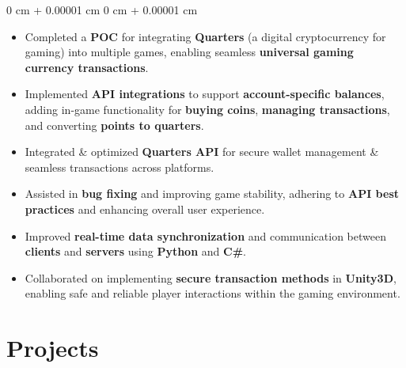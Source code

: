 \documentclass[10pt, letterpaper]{article}
\newenvironment{highlights}{
    \begin{itemize}[
        topsep=0.10 cm,
        parsep=0.10 cm,
        partopsep=0pt,
        itemsep=0pt,
        leftmargin=0 cm + 10pt
    ]
}{
    \end{itemize}
} %
\newenvironment{onecolentry}{
    \begin{adjustwidth}{
        0 cm + 0.00001 cm
    }{
        0 cm + 0.00001 cm
    }
}{
    \end{adjustwidth}
} %
\begin{document}
\begin{onecolentry}
	\begin{highlights}
		\item Completed a \textbf{POC} for integrating \textbf{Quarters} (a digital cryptocurrency for gaming) into multiple games, enabling seamless \textbf{universal gaming currency transactions}.
		\item Implemented \textbf{API integrations} to support \textbf{account-specific balances}, adding in-game functionality for \textbf{buying coins}, \textbf{managing transactions}, and converting \textbf{points to quarters}.
		\item Integrated \& optimized \textbf{Quarters API} for secure wallet management \& seamless transactions across platforms.
		\item Assisted in \textbf{bug fixing} and improving game stability, adhering to \textbf{API best practices} and enhancing overall user experience.
		\item Improved \textbf{real-time data synchronization} and communication between \textbf{clients} and \textbf{servers} using \textbf{Python} and \textbf{C\#}.
		\item Collaborated on implementing \textbf{secure transaction methods} in \textbf{Unity3D}, enabling safe and reliable player interactions within the gaming environment.
	\end{highlights}
\end{onecolentry}



\vspace{0.2 cm}


\section{Projects}
\vspace{0.05 cm}
\end{document}
